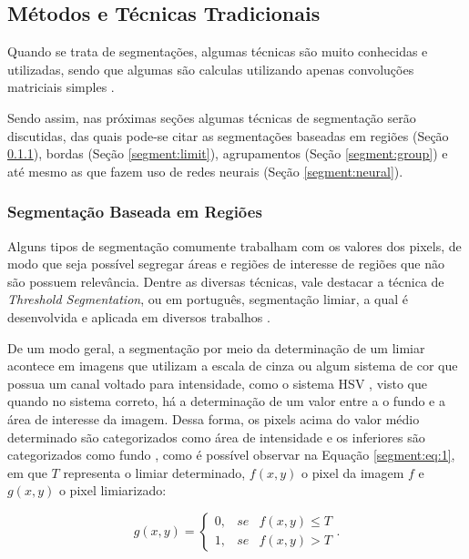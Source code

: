\subsection{Métodos e Técnicas Tradicionais}
\label{segment:segment}

Quando se trata de segmentações, algumas técnicas são muito conhecidas e utilizadas, sendo que algumas são calculas utilizando apenas convoluções matriciais simples \cite{Yuheng2017}.

Sendo assim, nas próximas seções algumas técnicas de segmentação serão discutidas, das quais pode-se citar as segmentações baseadas em regiões (Seção \ref{segment:region}), bordas  (Seção \ref{segment:limit}), agrupamentos  (Seção \ref{segment:group}) e até mesmo as que fazem uso de redes neurais  (Seção \ref{segment:neural}).

\subsubsection{Segmentação Baseada em Regiões}
\label{segment:region}

Alguns tipos de segmentação comumente trabalham com os valores dos pixels, de modo que seja possível segregar áreas e regiões de interesse de regiões que não são possuem relevância. Dentre as diversas técnicas, vale destacar a técnica de \textit{Threshold Segmentation}, ou em português, segmentação limiar, a qual é desenvolvida e aplicada em diversos trabalhos \citep{Yanowitz1989}.

De um modo geral, a segmentação por meio da determinação de um limiar acontece em imagens que utilizam a escala de cinza ou algum sistema de cor que possua um canal voltado para intensidade, como o sistema HSV \cite{schneider2003experimentos}, visto que quando no sistema correto, há a determinação de um valor entre a o fundo e a área de interesse da imagem. Dessa forma, os pixels acima do valor médio determinado são categorizados como área de intensidade e os inferiores são categorizados como fundo \cite{pedrini2008analise}, como é possível observar na Equação \ref{segment:eq:1}, em que $T$ representa o limiar determinado, $f(x,y)$ o pixel da imagem $f$ e $g(x,y)$ o pixel limiarizado:

\begin{equation}
\label{segment:eq:1}
    g(x,y) = \left\{\begin{matrix}
        0, & se & f(x,y) \leq T\\ 
        1, & se & f(x,y) > T
    \end{matrix}\right
    ..
\end{equation}


